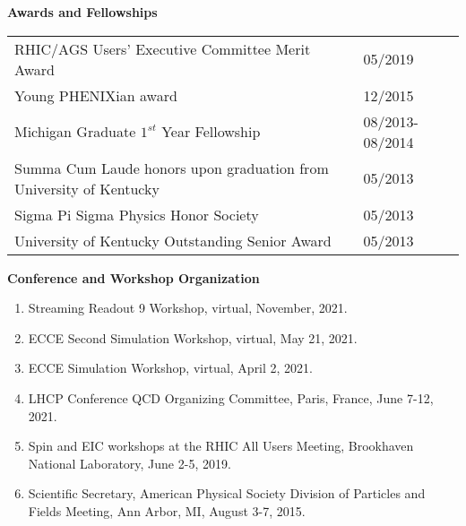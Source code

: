 \documentclass[11pt]{article}
\begin{document}

\vspace{7pt}
\begin{flushleft}
	\LARGE\textbf{Awards and Fellowships} \\
	\normalsize
	
	\begin{tabular}{ll}
		
		RHIC/AGS Users' Executive Committee Merit Award & 05/2019\\
		Young PHENIXian award & 12/2015\\
		Michigan Graduate $1^{st}$ Year Fellowship & 08/2013-08/2014 \\
		Summa Cum Laude honors upon graduation from University of Kentucky & 05/2013 \\
		Sigma Pi Sigma Physics Honor Society & 05/2013 \\
		University of Kentucky Outstanding Senior Award & 05/2013\\
	\end{tabular}
\end{flushleft}





\newpage






\vspace{7pt}
\begin{flushleft}
	\LARGE\textbf{Conference and Workshop Organization} \\
	\normalsize 
	\begin{enumerate}
		\item Streaming Readout 9 Workshop, virtual, November, 2021.
		\item ECCE Second Simulation Workshop, virtual, May 21, 2021.
		\item ECCE Simulation Workshop, virtual, April 2, 2021.
		\item LHCP Conference QCD Organizing Committee, Paris, France, June 7-12, 2021.
		\item Spin and EIC workshops at the RHIC All Users Meeting, Brookhaven National Laboratory, June 2-5, 2019.
		\item Scientific Secretary, American Physical Society Division of Particles and Fields Meeting, Ann Arbor, MI, August 3-7, 2015.
	\end{enumerate}
\end{flushleft}
\end{document}
